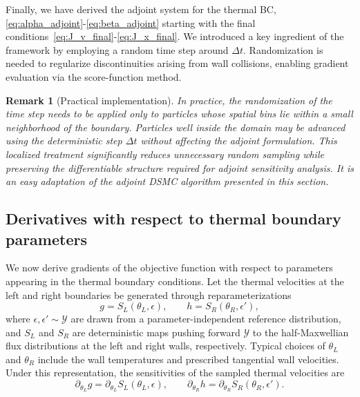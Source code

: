 \documentclass[12pt,nopreprintline]{elsarticle}
\newtheorem{remark}{Remark}
\begin{document}
Finally, we have derived the adjoint system for the thermal BC, \eqref{eq:alpha_adjoint}-\eqref{eq:beta_adjoint} starting with the final conditions~\eqref{eq:J_v_final}-\eqref{eq:J_x_final}. We introduced a key ingredient of the framework by employing a random time step around $\Delta t$. Randomization is needed to regularize discontinuities arising from wall collisions, enabling gradient evaluation via the score-function method.

\begin{remark}
[Practical implementation] In practice, the randomization of the time step needs to be applied only to particles whose spatial bins lie within a small neighborhood of the boundary. Particles well inside the domain may be advanced using the deterministic step $\Delta t$ without affecting the adjoint formulation. This localized treatment significantly reduces unnecessary random sampling while preserving the differentiable structure required for adjoint sensitivity analysis. It is an easy adaptation of the adjoint DSMC algorithm presented in this section.
\end{remark}









\subsection{Derivatives with respect to thermal boundary parameters}

We now derive gradients of the objective function with respect to parameters appearing in the thermal boundary conditions. Let the thermal velocities at the left and right boundaries be generated through reparameterizations
\[
g = S_L(\theta_L,\epsilon), \qquad h = S_R(\theta_R,\epsilon'),
\]
where $\epsilon,\epsilon' \sim \mathcal Y$ are drawn from a parameter-independent reference distribution, and $S_L$ and $S_R$ are deterministic maps pushing forward $\mathcal Y$ to the half-Maxwellian flux distributions at the left and right walls, respectively. Typical choices of $\theta_L$ and $\theta_R$ include the wall temperatures and prescribed tangential wall velocities. Under this representation, the sensitivities of the sampled thermal velocities are
\begin{equation}
\partial_{\theta_L} g = \partial_{\theta_L} S_L(\theta_L,\epsilon),
\qquad
\partial_{\theta_R} h = \partial_{\theta_R} S_R(\theta_R,\epsilon').
\label{eq:dg_dh}
\end{equation}
\end{document}
